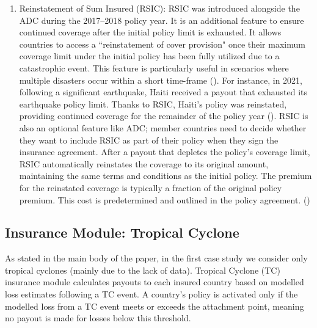 \documentclass[fleqn,mnsc,nonblindrev]{informs4}
\begin{document}
\begin{enumerate}[label=(\roman*)]
\item Reinstatement of Sum Insured (RSIC): RSIC was introduced alongside the ADC during the 2017–2018 policy year. It is an additional feature to ensure continued coverage after the initial policy limit is exhausted. It allows countries to access a ``reinstatement of cover provision" once their maximum coverage limit under the initial policy has been fully utilized due to a catastrophic event. This feature is particularly useful in scenarios where multiple disasters occur within a short time-frame (\cite{bollmann2019international}). For instance, in 2021, following a significant earthquake, Haiti received a payout that exhausted its earthquake policy limit. Thanks to RSIC, Haiti's policy was reinstated, providing continued coverage for the remainder of the policy year (\cite{CCRF_Haiti_2021}). RSIC is also an optional feature like ADC; member countries need to decide whether they want to include RSIC as part of their policy when they sign the insurance agreement. After a payout that depletes the policy's coverage limit, RSIC automatically reinstates the coverage to its original amount, maintaining the same terms and conditions as the initial policy. The premium for the reinstated coverage is typically a fraction of the original policy premium. This cost is predetermined and outlined in the policy agreement. (\cite{CCRF_Guatemala_2024})
\end{enumerate}

\subsection{Insurance Module: Tropical Cyclone}\label{app:ccrif_ins_module}
As stated in the main body of the paper, in the first case study we consider only tropical cyclones (mainly due to the lack of data). Tropical Cyclone (TC) insurance module calculates payouts to each insured country based on modelled loss estimates following a TC event. A country’s policy is activated only if the modelled loss from a TC event meets or exceeds the attachment point, meaning no payout is made for losses below this threshold.
\end{document}
